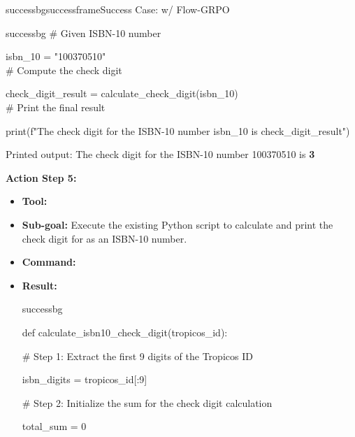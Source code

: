 \begin{small}
\begin{center}
\begin{casebox}{successbg}{successframe}{Success Case: \model w/ Flow-GRPO}
\begin{itemize}[nosep, leftmargin=*]
\begin{casecode}{successbg}
\hspace{0mm}\# Given ISBN-10 number

\hspace{0mm}isbn\_10 = "100370510"
\\

\hspace{0mm}\# Compute the check digit

\hspace{0mm}check\_digit\_result = calculate\_check\_digit(isbn\_10)
\\

\hspace{0mm}\# Print the final result

\hspace{0mm}print(f"The check digit for the ISBN-10 number {isbn\_10} is {check\_digit\_result}")
\end{casecode}
        Printed output: The check digit for the ISBN-10 number 100370510 is \textbf{3}
    \end{itemize}

    \vspace{1em}

    \textbf{Action Step 5:}
    \begin{itemize}[nosep, leftmargin=*]
        \item \textbf{Tool:} 
        \item \textbf{Sub-goal:} Execute the existing Python script to calculate and print the check digit for  as an ISBN-10 number.
        \item \textbf{Command:}

        \item \textbf{Result:}
        \begin{casecode}{successbg}

def calculate\_isbn10\_check\_digit(tropicos\_id):

    \hspace{4mm}\# Step 1: Extract the first 9 digits of the Tropicos ID

    \hspace{4mm}isbn\_digits = tropicos\_id[:9]

    \hspace{4mm}\# Step 2: Initialize the sum for the check digit calculation

    \hspace{4mm}total\_sum = 0


\end{casecode}
\end{itemize}
\end{casebox}
\end{center}
\end{small}
